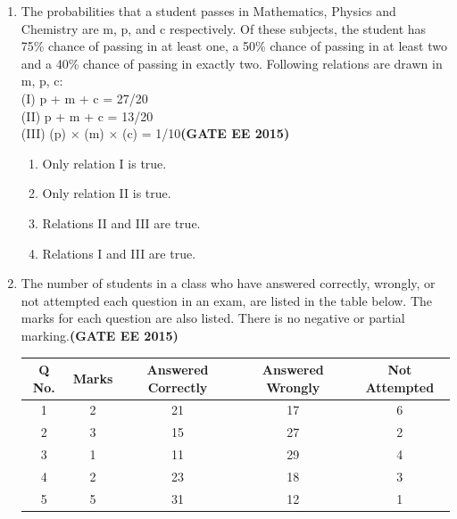 \documentclass[a4paper,12pt]{exam}
\theoremstyle{remark}
\begin{document}
\begin{enumerate}
\begin{figure}[H]
    \caption{}
    \label{fig:placeholder}
\end{figure}
\newpage
\item The probabilities that a student passes in Mathematics, Physics and Chemistry are m, p, and c respectively. Of these subjects, the student has 75\% chance of passing in at least one, a 50\% chance of passing in at least two and a 40\% chance of passing in exactly two. Following relations are drawn in m, p, c:\\
(I) p + m + c = 27/20\\
(II) p + m + c = 13/20\\
(III) (p) × (m) × (c) = 1/10\hfill{\textbf{(GATE EE 2015)}}\\

\begin{enumerate}
  \item Only relation I is true.
  \item Only relation II is true.
  \item Relations II and III are true.
  \item Relations I and III are true.
\end{enumerate}

\item The number of students in a class who have answered correctly, wrongly, or not attempted each question in an exam, are listed in the table below. The marks for each question are also listed. There is no negative or partial marking.\hfill{\textbf{(GATE EE 2015)}}

\begin{tabular}{|c|c|c|c|c|}
\hline
Q No. & Marks & Answered Correctly & Answered Wrongly & Not Attempted \\
\hline
1 & 2 & 21 & 17 & 6 \\
2 & 3 & 15 & 27 & 2 \\
3 & 1 & 11 & 29 & 4 \\
4 & 2 & 23 & 18 & 3 \\
5 & 5 & 31 & 12 & 1 \\
\hline
\end{tabular}


\end{enumerate}
\end{document}
